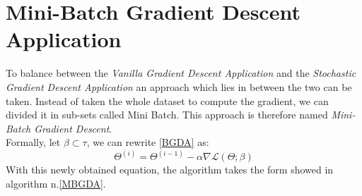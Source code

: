 \documentclass[conference]{IEEEtran}
\begin{document}
\section{Mini-Batch Gradient Descent Application}


To balance between the \textit{Vanilla Gradient Descent Application} and the  \textit{Stochastic Gradient Descent Application} an approach which lies in between the two can be taken. Instead of taken the whole dataset to compute the gradient, we can divided it in sub-sets called Mini Batch. This approach is therefore named \textit{Mini-Batch Gradient Descent}. \\
Formally, let $\beta \subset \tau$, we can rewrite \eqref{BGDA} as:
\begin{equation}
    \Theta^{(i)} = \Theta^{(i-1)} - \alpha\nabla\mathscr{L}(\Theta;\beta )\label{eq:MBGDA}
\end{equation}
With this newly obtained equation, the algorithm takes the form showed in algorithm n.\ref{MBGDA}.
\end{document}
